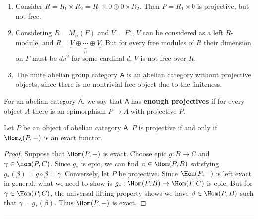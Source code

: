 \begin{exmp}
\begin{enumerate}
\item Consider $R=R_1\times R_2=R_1\times 0\oplus 0\times R_2$. Then $P=R_1\times 0$ is projective, but not free.
\item Considering $R=M_n(F)$ and $V=F^n$, $V$ can be considered as a left $R$-module, and $R=\underbrace{V\oplus\cdots\oplus V}_{n}$. But for every free modules of $R$ their dimension on $F$ must be $dn^2$ for some cardinal $d$, $V$ is not free over $R$.
\item The finite abelian group category $\mathsf{A}$ is an abelian category without projective objects, since there is no nontrivial free object due to the finiteness.
\end{enumerate}
\end{exmp}

\begin{defn} For an abelian category $\mathsf{A}$, we say that $\mathsf{A}$ has \textbf{enough projectives} if for every object $A$ there is an epimorphism $P\rightarrow A$ with projective $P$.
\end{defn}

\begin{lemma} Let $P$ be an object of abelian category $\mathsf{A}$. $P$ is projective if and only if $\Hom_{\mathsf{A}}(P,-)$ is an exact functor.
\end{lemma}
\begin{proof}
Suppose that $\Hom(P,-)$ is exact. Choose epic $g:B\rightarrow C$ and $\gamma\in \Hom(P,C)$. Since $g_*$ is epic, we can find $\beta\in \Hom (P,B)$ satisfying $g_*(\beta)=g\circ \beta=\gamma$. Conversely, let $P$ be projective. Since $\Hom(P,-)$ is left exact in general, what we need to show is $g_*:\Hom(P,B)\rightarrow \Hom(P,C)$ is epic. But for $\gamma\in \Hom(P,C)$, the universal lifting property shows we have $\beta\in \Hom(P,B)$ such that $\gamma=g_*(\beta)$. Thus $\Hom(P,-)$ is exact.
\end{proof}
\noindent\rule{\textwidth}{1pt}
\newline